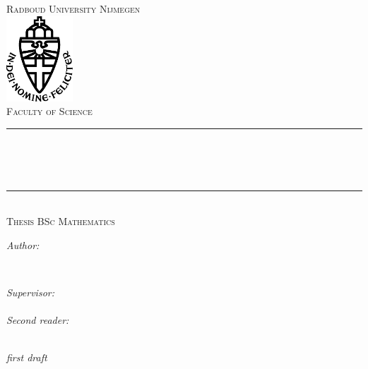 \begin{titlepage}
	\thispagestyle{empty}
	\newcommand{\HRule}{\rule{\linewidth}{0.5mm}}
	\center
	\textsc{\Large Radboud University Nijmegen}\\[.7cm]
	\includegraphics[width=25mm]{img/in_dei_nomine_feliciter.eps}\\[.5cm]
	\textsc{Faculty of Science}\\[0.5cm]
	
	\HRule \\[0.4cm]
	{ \huge \bfseries \thesistitle}\\[0.1cm]
	{\large \emph{\thesissubtitle}}\\
	\HRule \\[.5cm]
	\textsc{\large Thesis BSc Mathematics}\\[.5cm]
	
	\begin{minipage}{0.4\textwidth}
	\begin{flushleft} \large
	\emph{Author:}\\
	\thesisauthorfirst\space \textsc{\thesisauthorsecond}
	\end{flushleft}
	\end{minipage}
	~
	\begin{minipage}{0.4\textwidth}
	\begin{flushright} \large
	\emph{Supervisor:} \\
	\thesissupervisorfirst\space \textsc{\thesissupervisorsecond} \\[1em]
	\emph{Second reader:} \\
	\thesissecondreaderfirst\space \textsc{\thesissecondreadersecond}
	\end{flushright}
	\end{minipage}\\[4cm]
	\textit{first draft}
	\vfill
	{\large \thesisdate}\\
	\clearpage
\end{titlepage}